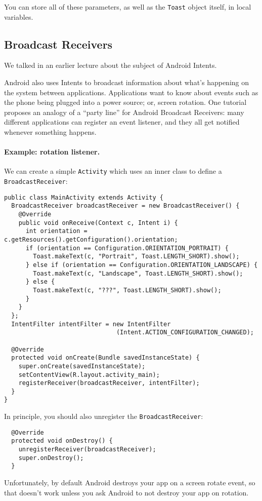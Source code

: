 You can store all of these parameters, as well as the {\tt Toast} object itself,
in local variables.

\subsection*{Broadcast Receivers}
We talked in an earlier lecture about the subject of Android Intents.

Android also uses Intents to broadcast information about what's
happening on the system between applications. Applications want to
know about events such as the phone being plugged into a power source;
or, screen rotation.  One
tutorial~\cite{broadcastreceiver}  proposes an analogy of a ``party line''
for Android Broadcast Receivers: many different applications can
register an event listener, and they all get notified whenever
something happens.

\paragraph{Example: rotation listener.} We can create a simple {\tt Activity} which uses an inner
class to define a {\tt BroadcastReceiver}:

{\small
\begin{verbatim}
public class MainActivity extends Activity {
  BroadcastReceiver broadcastReceiver = new BroadcastReceiver() {
    @Override
    public void onReceive(Context c, Intent i) {
      int orientation = c.getResources().getConfiguration().orientation;
      if (orientation == Configuration.ORIENTATION_PORTRAIT) {
        Toast.makeText(c, "Portrait", Toast.LENGTH_SHORT).show();
      } else if (orientation == Configuration.ORIENTATION_LANDSCAPE) {
        Toast.makeText(c, "Landscape", Toast.LENGTH_SHORT).show();
      } else {
        Toast.makeText(c, "???", Toast.LENGTH_SHORT).show();
      }
    }
  };
  IntentFilter intentFilter = new IntentFilter
                               (Intent.ACTION_CONFIGURATION_CHANGED);

  @Override
  protected void onCreate(Bundle savedInstanceState) {
    super.onCreate(savedInstanceState);
    setContentView(R.layout.activity_main);
    registerReceiver(broadcastReceiver, intentFilter);
  }
}
\end{verbatim}
}
In principle, you should also unregister the {\tt BroadcastReceiver}:
\begin{verbatim}
  @Override
  protected void onDestroy() {
    unregisterReceiver(broadcastReceiver);
    super.onDestroy();
  }
\end{verbatim}
Unfortunately, by default Android destroys your app on a screen rotate event, so 
that doesn't work unless you ask Android to not destroy your app on rotation. 

